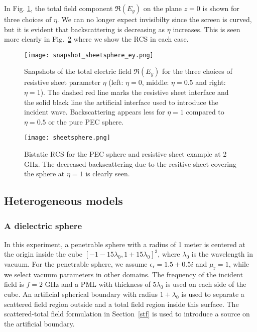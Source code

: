 \documentclass[a4paper,12pt]{article}
\newcommand{\epsr}{\epsilon_{\mathrm{r}}}
\newcommand{\mur}{\mu_{\mathrm{r}}}
\begin{document}
In Fig. \ref{fig:sheet_sphere_snap}, the total field component $\Re(E_y)$ on the plane $z=0$ is shown for three choices of $\eta$. We can no longer expect invisibilty since the screen is curved, but it is evident that backscattering is decreasing as  $\eta$ increases. This is seen more clearly in Fig.~\ref{fig:sheet_sphere_mie} where we show the RCS in each case.

\begin{figure}[!htb]
    \centering
    \texttt{[image: snapshot\_sheetsphere\_ey.png]}
    \caption{Snapshots of the total electric field $\Re(E_y)$ for the three choices of resistive sheet parameter $\eta$ (left: $\eta=0$, middle: $\eta=0.5$ and right: $\eta=1$). The dashed red line marks the resistive sheet interface and the solid black line the artificial interface used to introduce the incident wave. Backscattering appears less for $\eta=1$ compared to $\eta=0.5$ or the pure PEC sphere.}
    \label{fig:sheet_sphere_snap}
\end{figure}

\begin{figure}[!htb]
    \centering
    \texttt{[image: sheetsphere.png]} 
\caption{Bistatic RCS for the PEC sphere and resistive sheet example at 2 GHz.  The decreased backscattering due to the resitive sheet covering the sphere at $\eta=1$ is clearly seen.}
    \label{fig:sheet_sphere_mie}
\end{figure}




\subsection{Heterogeneous models}\label{sec:het}


\subsubsection{A dielectric sphere}\label{penet_sphere}


In this experiment, a penetrable sphere with a radius of 1 meter is centered at the origin inside the cube $[-1-15\lambda_0, 1+15\lambda_0]^3$, where $\lambda_0$ is the wavelength in vacuum. For the penetrable sphere, we assume $\epsr = 1.5+0.5i$ and $\mur = 1$, while we select vacuum parameters in other domains. The frequency of the incident field is $f = 2$ GHz and a PML with thickness of $5\lambda_0$ is used on each side of the cube. An artificial spherical boundary with radius $1+\lambda_0$ is used to separate a scattered field region outside and
a total field region inside this surface.  The scattered-total field formulation in Section~\ref{stf} is used to introduce a source on the artificial boundary.
\end{document}
